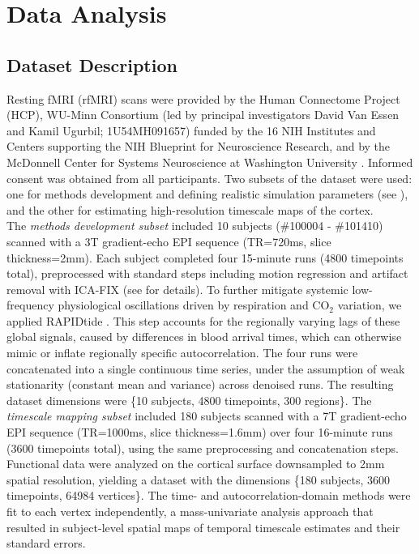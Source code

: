 \documentclass[docs/main.tex]{subfiles}
\begin{document}
\section{Data Analysis}\label{sec:data-analysis}

\subsection{Dataset Description}\label{sec:dataset-description}

Resting fMRI (rfMRI) scans were provided by the Human Connectome Project (HCP), WU-Minn Consortium (led by principal investigators David Van Essen and Kamil Ugurbil; 1U54MH091657) funded by the 16 NIH Institutes and Centers supporting the NIH Blueprint for Neuroscience Research, and by the McDonnell Center for Systems Neuroscience at Washington University \citep{van_essen_wu-minn_2013}. Informed consent was obtained from all participants. Two subsets of the dataset were used: one for methods development and defining realistic simulation parameters (see ), and the other for estimating high-resolution timescale maps of the cortex.\\

The \textit{methods development subset} included 10 subjects  (\#100004 - \#101410) scanned with a 3T gradient-echo EPI sequence (TR=720ms, slice thickness=2mm). Each subject completed four 15-minute runs (4800 timepoints total), preprocessed with standard steps including motion regression and artifact removal with ICA-FIX (see \citet{glasser_minimal_2013, salimi-khorshidi_automatic_2014} for details). To further mitigate systemic low-frequency physiological oscillations driven by respiration and $\text{CO}_2$ variation, we applied RAPIDtide \citep{frederick_rapidtide_2025}. This step accounts for the regionally varying lags of these global signals, caused by differences in blood arrival times, which can otherwise mimic or inflate regionally specific autocorrelation. The four runs were concatenated into a single continuous time series, under the assumption of weak stationarity (constant mean and variance) across denoised runs. The resulting dataset dimensions were \{10 subjects, 4800 timepoints, 300 regions\}. The \textit{timescale mapping subset} included 180 subjects scanned with a 7T gradient-echo EPI sequence (TR=1000ms, slice thickness=1.6mm) over four 16-minute runs (3600 timepoints total), using the same preprocessing and concatenation steps. Functional data were analyzed on the cortical surface downsampled to 2mm spatial resolution, yielding a dataset with the dimensions \{180 subjects, 3600 timepoints, 64984 vertices\}. The time- and autocorrelation-domain methods were fit to each vertex independently, a mass-univariate analysis approach that resulted in subject-level spatial maps of temporal timescale estimates and their standard errors.\\
\end{document}
